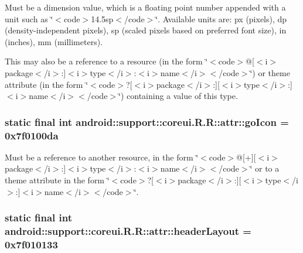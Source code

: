 Must be a dimension value, which is a floating point number appended with a unit such as \char`\"{}$<$code$>$14.5sp$<$/code$>$\char`\"{}. Available units are: px (pixels), dp (density-independent pixels), sp (scaled pixels based on preferred font size), in (inches), mm (millimeters). 

This may also be a reference to a resource (in the form \char`\"{}$<$code$>$@\mbox{[}$<$i$>$package$<$/i$>$:\mbox{]}$<$i$>$type$<$/i$>$:$<$i$>$name$<$/i$>$$<$/code$>$\char`\"{}) or theme attribute (in the form \char`\"{}$<$code$>$?\mbox{[}$<$i$>$package$<$/i$>$:\mbox{]}\mbox{[}$<$i$>$type$<$/i$>$:\mbox{]}$<$i$>$name$<$/i$>$$<$/code$>$\char`\"{}) containing a value of this type. \hypertarget{classandroid_1_1support_1_1coreui_1_1_r_1_1attr_27ffdfbad6e9d310289aa46e9ecdb996}{
\subsubsection[{goIcon}]{\setlength{\rightskip}{0pt plus 5cm}static final int android::support::coreui.R.R::attr::goIcon = 0x7f0100da}}
\label{classandroid_1_1support_1_1coreui_1_1_r_1_1attr_27ffdfbad6e9d310289aa46e9ecdb996}


Must be a reference to another resource, in the form \char`\"{}$<$code$>$@\mbox{[}+\mbox{]}\mbox{[}$<$i$>$package$<$/i$>$:\mbox{]}$<$i$>$type$<$/i$>$:$<$i$>$name$<$/i$>$$<$/code$>$\char`\"{} or to a theme attribute in the form \char`\"{}$<$code$>$?\mbox{[}$<$i$>$package$<$/i$>$:\mbox{]}\mbox{[}$<$i$>$type$<$/i$>$:\mbox{]}$<$i$>$name$<$/i$>$$<$/code$>$\char`\"{}. \hypertarget{classandroid_1_1support_1_1coreui_1_1_r_1_1attr_44affaf51d54de8676de82dfc8c50948}{
\subsubsection[{headerLayout}]{\setlength{\rightskip}{0pt plus 5cm}static final int android::support::coreui.R.R::attr::headerLayout = 0x7f010133}}
\label{classandroid_1_1support_1_1coreui_1_1_r_1_1attr_44affaf51d54de8676de82dfc8c50948}


